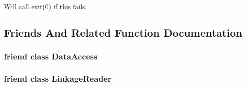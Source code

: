 Will call exit(0) if this fails. 

\subsection{Friends And Related Function Documentation}
\hypertarget{classSnpData_a079f8f0072d4d2ed008a2486f38b3834}{
\subsubsection[{DataAccess}]{\setlength{\rightskip}{0pt plus 5cm}friend class {\bf DataAccess}}}
\label{classSnpData_a079f8f0072d4d2ed008a2486f38b3834}
\hypertarget{classSnpData_aeec22b22ec66cea36cae09979a36d40c}{
\subsubsection[{LinkageReader}]{\setlength{\rightskip}{0pt plus 5cm}friend class {\bf LinkageReader}}}
\label{classSnpData_aeec22b22ec66cea36cae09979a36d40c}


